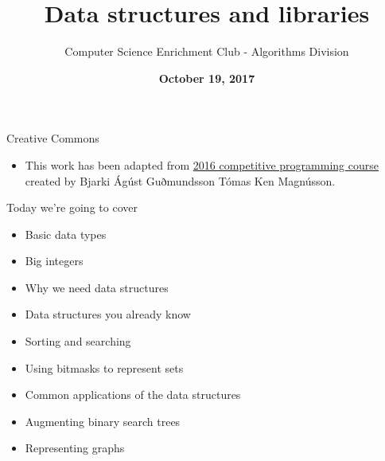 \documentclass[10pt]{beamer}
\title{Data structures and libraries}
\author{Computer Science Enrichment Club - Algorithms Division}
\date{\textbf{October 19, 2017}}
\newcommand{\bi}{\begin{itemize}}
\newcommand{\ei}{\end{itemize}}
\begin{document}
\maketitle

\begin{frame}{Creative Commons}
    \bi
        \item This work has been adapted from \href{https://github.com/SuprDewd/T-414-AFLV}{2016 competitive programming course} created by Bjarki Ágúst Guðmundsson Tómas Ken Magnússon.
    \ei
\end{frame}


\begin{frame}{Today we're going to cover}
    \vspace{30pt}
    \bi
        \item Basic data types
        \item Big integers
        \item Why we need data structures
        \item Data structures you already know
        \item Sorting and searching
        \item Using bitmasks to represent sets
        \item Common applications of the data structures
        \item Augmenting binary search trees
        \item Representing graphs
    \ei
\end{frame}

\end{document}
